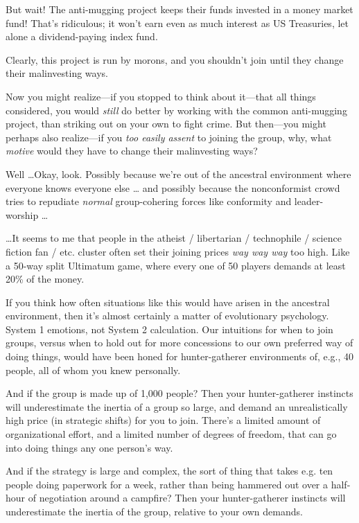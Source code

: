 {
 But wait! The anti-mugging project keeps their funds invested in a
money market fund! That's ridiculous; it
won't earn even as much interest as US Treasuries, let
alone a dividend-paying index fund.}

{
 Clearly, this project is run by morons, and you
shouldn't join until they change their malinvesting
ways.}

{
 Now you might realize---if you stopped to think about it---that
all things considered, you would \textit{still} do better by working
with the common anti-mugging project, than striking out on your own to
fight crime. But then---you might perhaps also realize---if you
\textit{too easily assent} to joining the group, why, what
\textit{motive} would they have to change their malinvesting ways?}

{
 Well \ldots Okay, look. Possibly because we're out
of the ancestral environment where everyone knows everyone else \ldots
and possibly because the nonconformist crowd tries to repudiate
\textit{normal} group-cohering forces like conformity and
leader-worship \ldots}

{
 \ldots It seems to me that people in the atheist / libertarian /
technophile / science fiction fan / etc. cluster often set their
joining prices \textit{way way way} too high. Like a 50-way split
Ultimatum game, where every one of 50 players demands at least 20\% of
the money.}

{
 If you think how often situations like this would have arisen in
the ancestral environment, then it's almost certainly a
matter of evolutionary psychology. System 1 emotions, not System 2
calculation. Our intuitions for when to join groups, versus when to
hold out for more concessions to our own preferred way of doing things,
would have been honed for hunter-gatherer environments of, e.g., 40
people, all of whom you knew personally.}

{
 And if the group is made up of 1,000 people? Then your
hunter-gatherer instincts will underestimate the inertia of a group so
large, and demand an unrealistically high price (in strategic shifts)
for you to join. There's a limited amount of
organizational effort, and a limited number of degrees of freedom, that
can go into doing things any one person's way.}

{
 And if the strategy is large and complex, the sort of thing that
takes e.g. ten people doing paperwork for a week, rather than being
hammered out over a half-hour of negotiation around a campfire? Then
your hunter-gatherer instincts will underestimate the inertia of the
group, relative to your own demands.}

